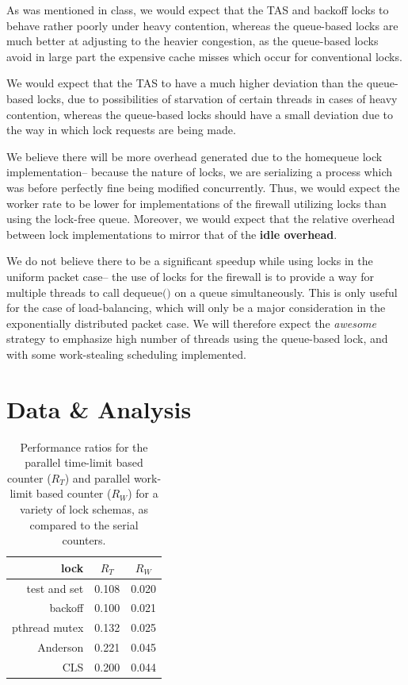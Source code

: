 \documentclass{article}
\newcommand{\ti}[1]{\emph{#1}}
\newcommand{\tb}[1]{\textbf{#1}}
\newcommand{\cpart}[1]{\newblock{\LARGE {\\\\#1}}}
\newcommand{\code}[1]{\texttt{$\text{#1}$}}
\begin{document}
\cpart{Lock Scaling}

As was mentioned in class, we would expect that the TAS and backoff locks to behave rather poorly under heavy contention, whereas the queue-based locks are much 
better at adjusting to the heavier congestion, as the queue-based locks avoid in large part the expensive cache misses which occur for conventional locks.

\cpart{Fairness}

We would expect that the TAS to have a much higher deviation than the queue-based locks, due to possibilities of starvation of certain threads in cases of heavy 
contention, whereas the queue-based locks should have a small deviation due to the way in which lock requests are being made.

\cpart{Packet Overhead}

We believe there will be more overhead generated due to the homequeue lock implementation-- because the nature of locks, we are serializing a process which was 
before perfectly fine being modified concurrently. Thus, we would expect the worker rate to be lower for implementations of the firewall utilizing locks than using 
the lock-free queue. Moreover, we would expect that the relative overhead between lock implementations to mirror that of the \tb{idle overhead}.

\cpart{Packet Scaling}

We do not believe there to be a significant speedup while using locks in the uniform packet case-- the use of locks for the firewall is to provide a way for 
multiple threads to call \code{dequeue()} on a queue simultaneously. This is only useful for the case of load-balancing, which will only be a major consideration in 
the exponentially distributed packet case. We will therefore expect the \ti{awesome} strategy to emphasize high number of threads using the queue-based lock, and 
with some work-stealing scheduling implemented.

\section{Data \& Analysis}

\cpart{Idle Overhead}

\begin{table}
\begin{center}
	\begin{tabular}{ r | c c }
		lock		&	$R_T$	&	$R_W$	\\
		\hline
		test and set	&	0.108	&	0.020	\\
		backoff		&	0.100	&	0.021	\\
		pthread mutex	&	0.132	&	0.025	\\
		Anderson	&	0.221	&	0.045	\\
		CLS		&	0.200	&	0.044	\\
	\end{tabular}
\end{center}
\caption{Performance ratios for the parallel time-limit based counter ($R_T$) and parallel work-limit based counter ($R_W$) for a variety of lock schemas, as compared to the serial counters.}
\label{idle_table}
\end{table}
\end{document}
